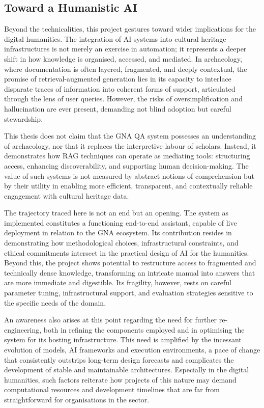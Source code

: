 \begin{spacing}{1.5}
\section{Toward a Humanistic AI}
Beyond the technicalities, this project gestures toward wider implications for the digital humanities. The integration of AI systems into cultural heritage infrastructures is not merely an exercise in automation; it represents a deeper shift in how knowledge is organised, accessed, and mediated. In archaeology, where documentation is often layered, fragmented, and deeply contextual, the promise of retrieval-augmented generation lies in its capacity to interlace disparate traces of information into coherent forms of support, articulated through the lens of user queries. However, the risks of oversimplification and hallucination are ever present, demanding not blind adoption but careful stewardship.

This thesis does not claim that the GNA QA system possesses an understanding of archaeology, nor that it replaces the interpretive labour of scholars. Instead, it demonstrates how RAG techniques can operate as mediating tools: structuring access, enhancing discoverability, and supporting human decision-making. The value of such systems is not measured by abstract notions of comprehension but by their utility in enabling more efficient, transparent, and contextually reliable engagement with cultural heritage data.

The trajectory traced here is not an end but an opening. The system as implemented constitutes a functioning end-to-end assistant, capable of live deployment in relation to the GNA ecosystem. Its contribution resides in demonstrating how methodological choices, infrastructural constraints, and ethical commitments intersect in the practical design of AI for the humanities. Beyond this, the project shows potential to restructure access to fragmented and technically dense knowledge, transforming an intricate manual into answers that are more immediate and digestible. Its fragility, however, rests on careful parameter tuning, infrastructural support, and evaluation strategies sensitive to the specific needs of the domain.

An awareness also arises at this point regarding the need for further re-engineering, both in refining the components employed and in optimising the system for its hosting infrastructure. This need is amplified by the incessant evolution of models, AI frameworks and execution environments, a pace of change that consistently outstrips long-term design forecasts and complicates the development of stable and maintainable architectures. Especially in the digital humanities, such factors reiterate how projects of this nature may demand computational resources and development timelines that are far from straightforward for organisations in the sector.


\end{spacing}
